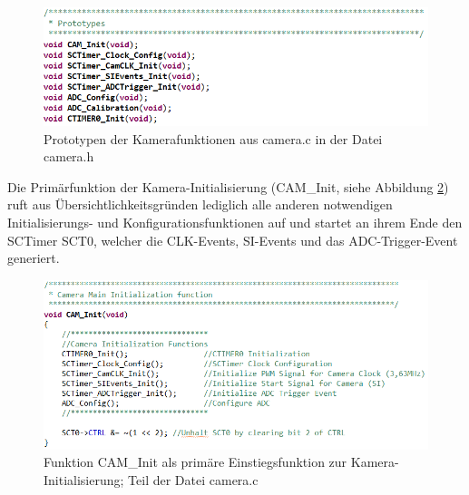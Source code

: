 \begin{figure}[H] %
\includegraphics[width=.95\textwidth]{sec7/images/code/camerah} 
\centering
\captionsetup{width=.95\textwidth}
\caption[Prototypen der Kamerafunktionen in der Datei \glqq{}camera.h\grqq{}]{Prototypen der Kamerafunktionen aus \glqq{}camera.c\grqq{} in der Datei \glqq{}camera.h\grqq{}}\centering
\label{fig:camh}
\end{figure}


Die Primärfunktion der Kamera-Initialisierung (\glqq{}CAM\_Init\grqq{}, siehe Abbildung \ref{fig:CAMInit}) ruft aus Übersichtlichkeitsgründen lediglich alle anderen notwendigen Initialisierungs- und Konfigurationsfunktionen auf und startet an ihrem Ende den SCTimer SCT0, welcher die CLK-Events, SI-Events und das ADC-Trigger-Event generiert.

\begin{figure}[H] %
\includegraphics[width=.95\textwidth]{sec7/images/code/CAMInit} 
\centering
\captionsetup{width=.95\textwidth}
\caption[Funktion \glqq{}CAM\_Init\grqq{} aus der Datei \glqq{}camera.c\grqq{}]{Funktion \glqq{}CAM\_Init\grqq{} als primäre Einstiegsfunktion zur Kamera-Initialisierung; Teil der Datei \glqq{}camera.c\grqq{}}\centering
\label{fig:CAMInit}
\end{figure}


